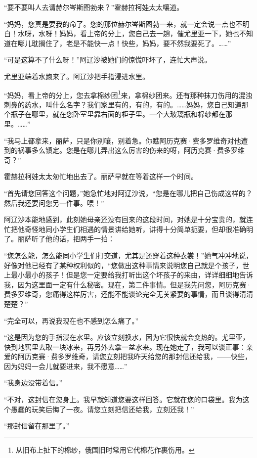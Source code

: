\par “要不要叫人去请赫尔岑斯图勃来？”霍赫拉柯娃太太嚷道。
\par “妈妈，您真是要我的命了。您的那位赫尔岑斯图勃一来，就一定会说一点也不明白！水呀，水呀！妈妈，看上帝的分上，您自己去一趟，催尤里亚一下，她也不知道在哪儿耽搁住了，老是不能快一点！快些，妈妈，要不然我要死了。……”
\par “可是这算不了什么呀！”阿辽沙被她们的惊慌吓坏了，连忙大声说。
\par 尤里亚端着水跑来了。阿辽沙把手指浸进水里。
\par “妈妈，看上帝的分上，您去拿棉纱团\footnote{从旧布上扯下的棉纱，俄国旧时常用它代棉花作裹伤用。}来，拿棉纱团来。还有那种抹刀伤用的混浊刺鼻的药水，叫什么名字？我们家里有的，有的，有的。……妈妈，您自己知道那个瓶子在哪里，就在您卧室里靠右面的柜子里。一个大玻璃瓶和棉纱都在那里。……”
\par “我马上都拿来，丽萨，只是你别嚷，别着急。你瞧阿历克赛·费多罗维奇对他遭到的祸事多么镇定。您是在哪儿弄出这么厉害的伤来的呀，阿历克赛·费多罗维奇？”
\par 霍赫拉柯娃太太匆忙地出去了。丽萨早就在等着这样一个时间。
\par “首先请您回答这个问题，”她急忙地对阿辽沙说，“您是在哪儿把自己伤成这样的？然后我还要问您另一件事。喂！”
\par 阿辽沙本能地感到，此刻她母亲还没有回来的这段时间，对她是十分宝贵的，就连忙把他奇怪地同小学生们相遇的情景讲给她听，讲得十分简单扼要，但却很准确明了。丽萨听了他的话，把两手一拍：
\par “您怎么能，怎么能同小学生们打交道，尤其是还穿着这种衣裳！”她气冲冲地说，好像对他已经有了某种权利似的，“您做出这种事情来说明您自己就是个孩子，世上最小最小的孩子！但是您一定要给我打听出这个坏孩子的来由，详详细细地告诉我，因为这里面一定有什么秘密。现在，第二件事情。但是我先问您，阿历克赛·费多罗维奇，您痛得这样厉害，还能不能谈论完全无关紧要的事情，而且谈得清清楚楚？”
\par “完全可以，再说我现在也不感到怎么痛了。”
\par “这是因为您的手指浸在水里。应该立刻换水，因为它很快就会变热的。尤里亚，快到地窖里去取一块冰来，再另外去拿一盆水来。现在她走了，我可以谈正事：亲爱的阿历克赛·费多罗维奇，请您立刻把我昨天给您的那封信还给我，——快些，因为妈妈一会儿就要进来，我不愿意……”
\par “我身边没带着信。”
\par “不对，这封信在您身上。我早就知道您要这样回答。它就在您的口袋里。我为这个愚蠢的玩笑后悔了一夜。请您立刻把信还给我，立刻还我！”
\par “那封信留在那里了。”
